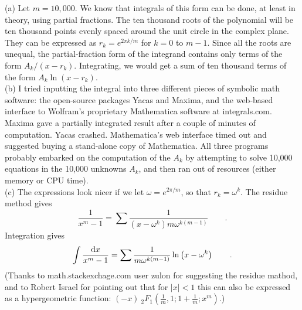 (a) Let $m=10,000$. We know that integrals of this form can be done, at least in theory, using partial fractions.
The ten thousand roots of the polynomial will be ten thousand points evenly spaced around
the unit circle in the complex plane. They can be expressed as $r_k=e^{2\pi k/m}$ for $k=0$ to $m-1$.
Since all the roots are unequal, the partial-fraction form of the integrand contains only terms
of the form $A_k/(x-r_k)$. Integrating, we would get a sum of ten thousand terms of the form
$A_k\ln(x-r_k)$.\\
(b) I tried inputting the integral into three different pieces of symbolic
math software: the open-source packages Yacas and Maxima, and the web-based interface to
Wolfram's proprietary Mathematica software at integrals.com. Maxima gave a partially integrated result after a couple
of minutes of computation. Yacas crashed. Mathematica's web interface timed out and suggested
buying a stand-alone copy of Mathematica. All three programs probably embarked on the computation
of the $A_k$ by attempting to solve 10,000 equations in the 10,000 unknowns $A_k$, and then ran out
of resources (either memory or CPU time).\\
(c) The expressions look nicer if we let $\omega=e^{2\pi/m}$, so that $r_k=\omega^k$. The residue method gives
\begin{equation*}
  \frac{1}{x^m-1} = \sum \frac{1}{(x-\omega^k)m \omega^{k(m-1)}} \qquad .
\end{equation*}
Integration gives
\begin{equation*}
  \int \frac{\textup{d} x}{x^m-1} = \sum \frac{1}{m \omega^{k(m-1)}}\ln\left(x-\omega^k\right) \qquad .
\end{equation*}
(Thanks to math.stackexchage.com user zulon for suggesting the residue mathod, and to
Robert Israel for pointing out that for $|x|<1$ this can also be expressed as a hypergeometric function:
$(- x)\ {}_2F_1\left(\frac{1}{m},1; 1+\frac{1}{m}; x^m\right)$.)
